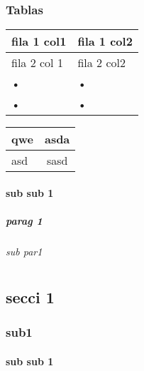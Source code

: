 \documentclass[12pt,a4paper,openany]{book}
\begin{document}

\Blindtext[1]


\subsection{Tablas}

\begin{tabular}{|p{3cm}|p{10cm}|}
\hline 
fila 1 col1  & fila 1 col2 \\ 
\hline 
fila 2 col 1 & fila 2 col2  \\ 
\hline 
• & • \\ 
\hline 
• & • \\ 
\hline 
\end{tabular} 

\begin{tabular}{|p{1cm}|c|}
\hline 
\rule[-1cm]{0pt}{1cm} qwe & asda \\ 
\hline 
\rule[-1ex]{0pt}{2.5ex} asd  & sasd \\ 
\hline 
\end{tabular} 



\subsubsection{sub sub 1}
\Blindtext[3]
\paragraph{parag 1}
\Blindtext[3]
\subparagraph{sub par1}
\Blindtext[3]

	





\chapter{}
\Blindtext[3]
\section{secci 1}
\Blindtext[3]
\subsection{sub1}
\Blindtext[3]
\subsubsection{sub sub 1}
\end{document}
